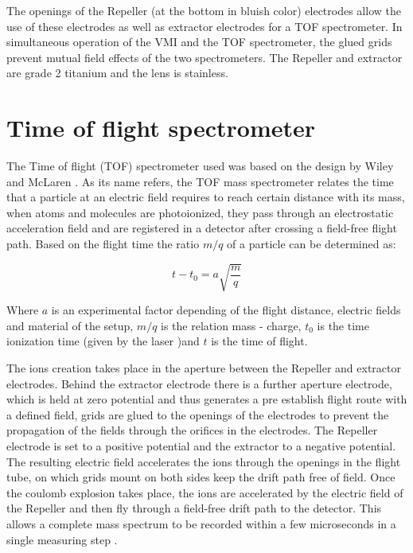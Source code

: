 The openings of the Repeller (at the bottom in bluish color) electrodes allow the use of these electrodes as well as extractor electrodes for a TOF spectrometer. In simultaneous operation of the VMI and the TOF spectrometer, the glued grids prevent mutual field effects of the two spectrometers.  The Repeller and extractor are grade 2 titanium and the lens is stainless.

\section{Time of flight spectrometer}

The Time of flight (TOF) spectrometer used was based on the design by Wiley and McLaren \cite{wiley_timeflight_1955}. As its name refers, the TOF mass spectrometer relates the time that a particle at an electric field requires to reach certain distance with its mass,  when atoms and molecules are photoionized,  they pass through an electrostatic acceleration field and are registered in a detector after crossing a field-free flight path. Based on the flight time the ratio $m/q$ of a particle can be determined as:

\begin{equation}
t-t_{0}=a\sqrt{\frac{m}{q}}
\end{equation}

Where $a$ is an experimental factor depending of the flight distance, electric fields and material of the setup,  $m/q$ is the relation mass - charge, $t_{0}$ is the time ionization time (given by the laser )and $t$ is the time of flight.

The ions creation takes place in the aperture between the Repeller and extractor electrodes. Behind the extractor electrode there is a further aperture electrode, which is held at zero potential and thus generates a pre establish flight route with a defined field, grids are glued to the openings of the electrodes to prevent the propagation of the fields through the orifices in the electrodes. The Repeller electrode is set to a positive potential and the extractor to a negative potential. The resulting electric field accelerates the ions through the openings in the flight tube, on which grids mount on both sides keep the drift path free of field.
Once the coulomb explosion takes place, the ions are accelerated by the electric field of the Repeller and then fly through a field-free drift path to the detector. This allows a complete mass spectrum to be recorded within a few microseconds in a single measuring step \cite{mobius_time--flight_2016}.

